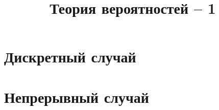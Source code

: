 \documentclass{book}
\begin{document}
\title{Теория вероятностей -- 1}
\maketitle
\tableofcontents


\part{Дискретный случай}



\part{Непрерывный случай}


\end{document}
